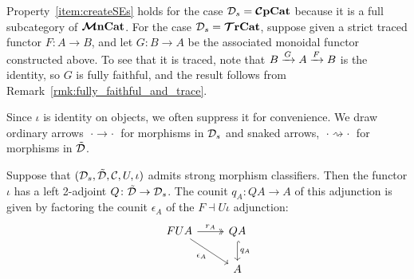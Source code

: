 \documentclass[11pt,oneside,article]{memoir}
\begin{document}
\begin{example}
Property~\ref{item:createSEs} holds for the case $\mathcal{D}_s=\bm{\mathcal{C}}\mathbf{pCat}$ because it is a full
subcategory of $\bm{\mathcal{M}}\mathbf{nCat}$. For the case $\mathcal{D}_s=\bm{\mathcal{T}}\mathbf{rCat}$, suppose given a strict traced functor
$F\colon A\to B$, and let $G\colon B\to A$ be the associated monoidal functor constructed above. To
see that it is traced, note that $B\xrightarrow{G}A\xrightarrow{F}B$ is the identity, so $G$ is fully faithful, and
the result follows from Remark~\ref{rmk:fully_faithful_and_trace}.
\end{example}

Since $\iota$ is identity on objects, we often suppress it for convenience. We draw ordinary arrows
$\;\cdot\to\cdot\;$ for morphisms in $\mathcal{D}_s$ and snaked arrows, $\;\cdot\rightsquigarrow\cdot\;$
for morphisms in $\tilde{\mathcal{D}}$.

\begin{theorem}
      \label{thm:strong_classifier}
   Suppose that $(\mathcal{D}_s,\tilde{\mathcal{D}},\mathcal{C},U,\iota)$ admits strong morphism classifiers. Then the
   functor $\iota$ has a left 2-adjoint $Q\colon\tilde{\mathcal{D}}\to\mathcal{D}_s$. The counit $q_A\colon QA\to A$
   of this adjunction is given by factoring the counit $\epsilon_A$ of the $F\dashv U\iota$
   adjunction:
   \begin{equation} \begin{tikzcd}
         \label{eqn:factorization_counit}
      FUA \ar[r,two heads,"r_A"] \ar[dr,"\epsilon_A"']
         & QA \ar[d,hook,"q_A"] \\
      & A
   \end{tikzcd} \end{equation}
\end{theorem}
\end{document}
